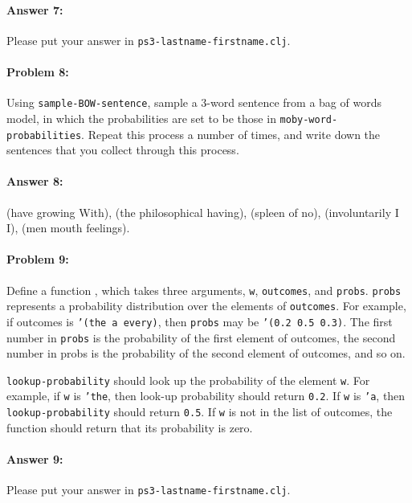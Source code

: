 \documentclass[10pt]{article}
\newcommand{\required}[1]{{\color{blue}{#1}}}
\newcommand{\PSnum}{3}
\begin{document}
\paragraph{Answer 7:} Please put your answer in
\texttt{ps\PSnum-lastname-firstname.clj}.

\noindent\hrulefill %

\paragraph{Problem 8:}

Using \texttt{sample-BOW-sentence}, sample a 3-word sentence from a
bag of words model, in which the probabilities are set to be those in
\texttt{moby-word-probabilities}. Repeat this process a number of
times, and write down the sentences that you collect through this
process.

\paragraph{Answer 8:} (have growing With), (the philosophical having), (spleen of no), (involuntarily I I), (men mouth feelings).

\noindent\hrulefill %

\paragraph{Problem 9:}

Define a function \required{\texttt{lookup-probability}}, which takes three
arguments, \texttt{w}, \texttt{outcomes}, and
\texttt{probs}. \texttt{probs} represents a probability distribution
over the elements of \texttt{outcomes}. For example, if outcomes is
\texttt{'(the a every)}, then \texttt{probs} may be
\texttt{'(0.2 0.5 0.3)}. The first number in \texttt{probs} is the
probability of the first element of outcomes, the second number in
probs is the probability of the second element of outcomes, and so on.

\texttt{lookup-probability} should look up the probability of the
element \texttt{w}. For example, if \texttt{w} is \texttt{'the},
then look-up probability should return \texttt{0.2}. If \texttt{w}
is \texttt{'a}, then \texttt{lookup-probability} should return
\texttt{0.5}.  If \texttt{w} is not in the list of outcomes,
the function should return that its probability is zero.

\paragraph{Answer 9:} Please put your answer in
\texttt{ps\PSnum-lastname-firstname.clj}.
\end{document}
